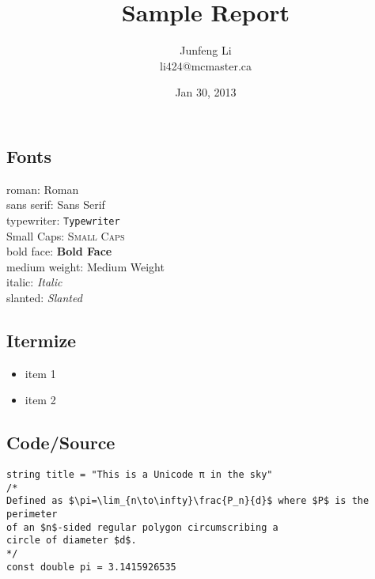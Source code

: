 \documentclass{article}
\title{Sample Report}
\author{Junfeng Li \\ li424@mcmaster.ca}
\date{Jan 30, 2013}
\begin{document}
\maketitle

\subsection{Fonts}

roman: \textrm{Roman} \\
sans serif: \textsf{Sans Serif} \\
typewriter: \texttt{Typewriter} \\
Small Caps: \textsc{Small Caps} \\
bold face: \textbf{Bold Face} \\
medium weight: \textmd{Medium Weight} \\
italic: \textit{Italic} \\
slanted: \textsl{Slanted} \\

\subsection{Itermize}

\begin{itemize}
\item item 1
\item item 2
\end{itemize}

\subsection{Code/Source}

\begin{verbatim}
string title = "This is a Unicode π in the sky"
/*
Defined as $\pi=\lim_{n\to\infty}\frac{P_n}{d}$ where $P$ is the perimeter
of an $n$-sided regular polygon circumscribing a
circle of diameter $d$.
*/
const double pi = 3.1415926535
\end{verbatim}
\end{document}
